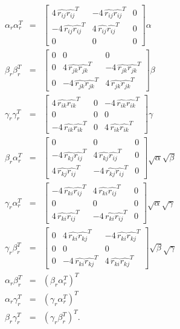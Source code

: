 \documentclass[11pt]{article}
\newcommand{\hatr}[1]{\mbox{$\hat{{r}_{#1}}$}}
\begin{document}
\begin{eqnarray}
\alpha_{r} \alpha_{r}^T &=& 
\left[ 
\begin{array}{ccc}
4 \,\hatr{ij} \hatr{ij}^T & -4\,\hatr{ij} \hatr{ij}^T & 0\\
-4\,\hatr{ij} \hatr{ij}^T & 4\,\hatr{ij} \hatr{ij}^T & 0 \\
0 & 0 & 0
\end{array}
\right] \alpha \\
\beta_{r} \beta_{r}^T &=&
 \left[ 
\begin{array}{ccc}
0 & 0 & 0 \\
0 & 4 \,\hatr{jk} \hatr{jk}^T & -4 \,\hatr{jk} \hatr{jk}^T \\
0 & -4\,\hatr{jk} \hatr{jk}^T  & 4\,\hatr{jk} \hatr{jk}^T  
\end{array}
\right] \beta \\
\gamma_{r} \gamma_{r}^T &=&
\left[ 
\begin{array}{ccc}
4 \,\hatr{ik} \hatr{ik}^T & 0 & -4 \,\hatr{ik} \hatr{ik}^T \\
0 & 0 & 0 \\
-4 \,\hatr{ik} \hatr{ik}^T & 0 & 4\,\hatr{ik} \hatr{ik}^T  
\end{array}
\right] \gamma \\
\beta_{r} \alpha_{r}^T &=& 
 \left[ 
\begin{array}{ccc}
0 & 0 & 0 \\
-4\,\hatr{kj} \hatr{ij}^T  & 4\,\hatr{kj} \hatr{ij}^T  & 0 \\
4\,\hatr{kj} \hatr{ij}^T  & -4\,\hatr{kj} \hatr{ij}^T  & 0 
\end{array}
\right] \sqrt{\alpha} \sqrt{\beta} \\
\gamma_{r} \alpha_{r}^T &=&
\left[ 
\begin{array}{ccc}
-4 \,\hatr{ki} \hatr{ij}^T & 4 \,\hatr{ki} \hatr{ij}^T & 0 \\
0 & 0 & 0 \\
4\,\hatr{ki} \hatr{ij}^T  & -4\,\hatr{ki} \hatr{ij}^T  & 0 
\end{array}
\right] \sqrt{\alpha} \sqrt{\gamma} \\
\gamma_{r} \beta_{r}^T &=&
 \left[ 
\begin{array}{ccc}
0 & 4 \,\hatr{ki} \hatr{kj}^T & -4 \,\hatr{ki} \hatr{kj}^T\\
0 & 0 & 0 \\
0 & -4\,\hatr{ki} \hatr{kj}^T & 4\,\hatr{ki} \hatr{kj}^T 
\end{array}
\right] \sqrt{\beta} \sqrt{\gamma}\\
\alpha_{r} \beta_{r}^T &=& (\beta_{r} \alpha_{r}^T )^T \\
\alpha_{r} \gamma_{r}^T &=& (\gamma_{r}\alpha_{r}^T)^T \\
\beta_{r} \gamma_{r}^T &=& (\gamma_{r}\beta_{r}^T)^T.
\end{eqnarray}
\end{document}
